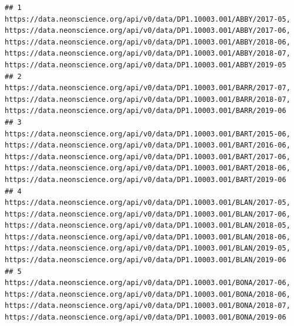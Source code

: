 \documentclass[]{book}
\begin{document}
\begin{verbatim}
## 1                                                                                                                                                                                                                                                                                      https://data.neonscience.org/api/v0/data/DP1.10003.001/ABBY/2017-05, https://data.neonscience.org/api/v0/data/DP1.10003.001/ABBY/2017-06, https://data.neonscience.org/api/v0/data/DP1.10003.001/ABBY/2018-06, https://data.neonscience.org/api/v0/data/DP1.10003.001/ABBY/2018-07, https://data.neonscience.org/api/v0/data/DP1.10003.001/ABBY/2019-05
## 2                                                                                                                                                                                                                                                                                                                                                                                                                                https://data.neonscience.org/api/v0/data/DP1.10003.001/BARR/2017-07, https://data.neonscience.org/api/v0/data/DP1.10003.001/BARR/2018-07, https://data.neonscience.org/api/v0/data/DP1.10003.001/BARR/2019-06
## 3                                                                                                                                                                                                                                                                                      https://data.neonscience.org/api/v0/data/DP1.10003.001/BART/2015-06, https://data.neonscience.org/api/v0/data/DP1.10003.001/BART/2016-06, https://data.neonscience.org/api/v0/data/DP1.10003.001/BART/2017-06, https://data.neonscience.org/api/v0/data/DP1.10003.001/BART/2018-06, https://data.neonscience.org/api/v0/data/DP1.10003.001/BART/2019-06
## 4                                                                                                                                                                                                                 https://data.neonscience.org/api/v0/data/DP1.10003.001/BLAN/2017-05, https://data.neonscience.org/api/v0/data/DP1.10003.001/BLAN/2017-06, https://data.neonscience.org/api/v0/data/DP1.10003.001/BLAN/2018-05, https://data.neonscience.org/api/v0/data/DP1.10003.001/BLAN/2018-06, https://data.neonscience.org/api/v0/data/DP1.10003.001/BLAN/2019-05, https://data.neonscience.org/api/v0/data/DP1.10003.001/BLAN/2019-06
## 5                                                                                                                                                                                                                                                                                                                                                           https://data.neonscience.org/api/v0/data/DP1.10003.001/BONA/2017-06, https://data.neonscience.org/api/v0/data/DP1.10003.001/BONA/2018-06, https://data.neonscience.org/api/v0/data/DP1.10003.001/BONA/2018-07, https://data.neonscience.org/api/v0/data/DP1.10003.001/BONA/2019-06

\end{verbatim}
\end{document}
